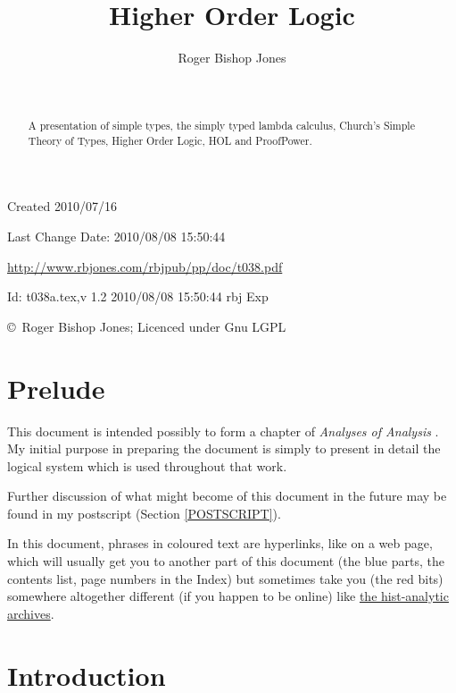 \documentclass[11pt]{article}
\title{Higher Order Logic}
\author{Roger Bishop Jones}
\date{\ }
\begin{document}
\begin{titlepage}
\maketitle
\begin{abstract}
A presentation of simple types, the simply typed lambda calculus, Church's Simple Theory of Types, Higher Order Logic, HOL and ProofPower.
\end{abstract}
\vfill

\begin{centering}
{\footnotesize

Created 2010/07/16

Last Change $ $Date: 2010/08/08 15:50:44 $ $

\href{http://www.rbjones.com/rbjpub/pp/doc/t038.pdf}
{http://www.rbjones.com/rbjpub/pp/doc/t038.pdf}

$ $Id: t038a.tex,v 1.2 2010/08/08 15:50:44 rbj Exp $ $

\copyright\ Roger Bishop Jones; Licenced under Gnu LGPL

}%
\end{centering}

\thispagestyle{empty}
\end{titlepage}

\newpage
\addtocounter{page}{1}
{\parskip=0pt\tableofcontents}

\section{Prelude}

This document is intended possibly to form a chapter of {\it Analyses of Analysis} \cite{rbjb001}.
My initial purpose in preparing the document is simply to present in detail the logical system which is used throughout that work.

Further discussion of what might become of this document in the future may be found in my postscript (Section \ref{POSTSCRIPT}).

In this document, phrases in coloured text are hyperlinks, like on a web page, which will usually get you to another part of this document (the blue parts, the contents list, page numbers in the Index) but sometimes take you (the red bits) somewhere altogether different (if you happen to be online) like \href{http://rbjones.com/pipermail/hist-analytic_rbjones.com}{the hist-analytic archives}.

\section{Introduction}
\end{document}
